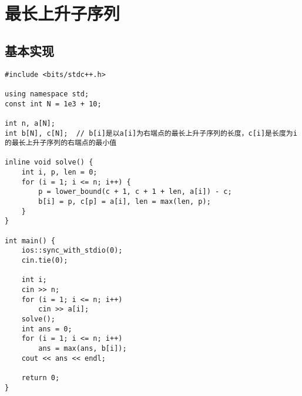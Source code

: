 \section{最长上升子序列}

    \subsection{基本实现}
\begin{lstlisting}
#include <bits/stdc++.h>

using namespace std;
const int N = 1e3 + 10;

int n, a[N];
int b[N], c[N];  // b[i]是以a[i]为右端点的最长上升子序列的长度，c[i]是长度为i的最长上升子序列的右端点的最小值

inline void solve() {
    int i, p, len = 0;
    for (i = 1; i <= n; i++) {
        p = lower_bound(c + 1, c + 1 + len, a[i]) - c;
        b[i] = p, c[p] = a[i], len = max(len, p);
    }
}

int main() {
    ios::sync_with_stdio(0);
    cin.tie(0);

    int i;
    cin >> n;
    for (i = 1; i <= n; i++)
        cin >> a[i];
    solve();
    int ans = 0;
    for (i = 1; i <= n; i++)
        ans = max(ans, b[i]);
    cout << ans << endl;

    return 0;
}
\end{lstlisting}

